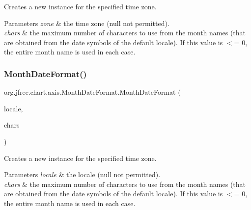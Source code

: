 Creates a new instance for the specified time zone.


\begin{DoxyParams}{Parameters}
{\em zone} & the time zone ({\ttfamily null} not permitted). \\
\hline
{\em chars} & the maximum number of characters to use from the month names (that are obtained from the date symbols of the default locale). If this value is $<$= 0, the entire month name is used in each case. \\
\hline
\end{DoxyParams}
\mbox{\label{classorg_1_1jfree_1_1chart_1_1axis_1_1_month_date_format_a83ee78aaeb24a76793268c5a6142a6d7}} 
\subsubsection{\texorpdfstring{Month\+Date\+Format()}{MonthDateFormat()}\hspace{0.1cm}{\footnotesize\ttfamily [5/7]}}
{\footnotesize\ttfamily org.\+jfree.\+chart.\+axis.\+Month\+Date\+Format.\+Month\+Date\+Format (\begin{DoxyParamCaption}\item[{Locale}]{locale,  }\item[{int}]{chars }\end{DoxyParamCaption})}

Creates a new instance for the specified time zone.


\begin{DoxyParams}{Parameters}
{\em locale} & the locale ({\ttfamily null} not permitted). \\
\hline
{\em chars} & the maximum number of characters to use from the month names (that are obtained from the date symbols of the default locale). If this value is $<$= 0, the entire month name is used in each case. \\
\hline
\end{DoxyParams}
\mbox{\label{classorg_1_1jfree_1_1chart_1_1axis_1_1_month_date_format_af58ea4c893ab9d48426c15666c09722d}} 
